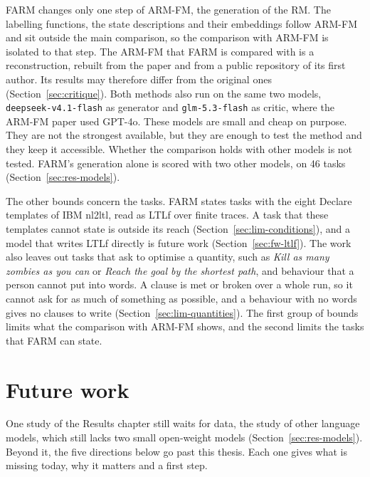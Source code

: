 \documentclass[11pt,english,listoffigures,listoftables]{tfgetsinf}
\begin{document}
FARM changes only one step of ARM-FM, the generation of the RM. The labelling functions, the state descriptions and their embeddings follow ARM-FM and sit outside the main comparison, so the comparison with ARM-FM is isolated to that step. The ARM-FM that FARM is compared with is a reconstruction, rebuilt from the paper and from a public repository of its first author. Its results may therefore differ from the original ones (Section~\ref{sec:critique}). Both methods also run on the same two models, \texttt{deepseek-v4.1-flash} as generator and \texttt{glm-5.3-flash} as critic, where the ARM-FM paper used GPT-4o. These models are small and cheap on purpose. They are not the strongest available, but they are enough to test the method and they keep it accessible. Whether the comparison holds with other models is not tested. FARM's generation alone is scored with two other models, on 46 tasks (Section~\ref{sec:res-models}).

The other bounds concern the tasks. FARM states tasks with the eight Declare templates of IBM nl2ltl, read as LTLf over finite traces. A task that these templates cannot state is outside its reach (Section~\ref{sec:lim-conditions}), and a model that writes LTLf directly is future work (Section~\ref{sec:fw-ltlf}). The work also leaves out tasks that ask to optimise a quantity, such as \textit{Kill as many zombies as you can} or \textit{Reach the goal by the shortest path}, and behaviour that a person cannot put into words. A clause is met or broken over a whole run, so it cannot ask for as much of something as possible, and a behaviour with no words gives no clauses to write (Section~\ref{sec:lim-quantities}). The first group of bounds limits what the comparison with ARM-FM shows, and the second limits the tasks that FARM can state.


\chapter{Future work}
\label{chap:future-work}

One study of the Results chapter still waits for data, the study of other language models, which still lacks two small open-weight models (Section~\ref{sec:res-models}). Beyond it, the five directions below go past this thesis. Each one gives what is missing today, why it matters and a first step.
\end{document}
